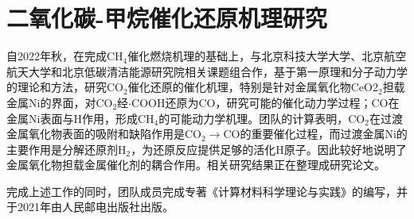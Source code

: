 \section{二氧化碳-甲烷催化还原机理研究}
自2022年秋，在完成$\mathrm{CH}_4$催化燃烧机理的基础上，与北京科技大学大学、北京航空航天大学和北京低碳清洁能源研究院相关课题组合作，基于第一原理和分子动力学的理论和方法，研究$\mathrm{CO}_2$催化还原的催化机理，特别是针对金属氧化物$\mathrm{CeO2}_2$担载金属$\mathrm{Ni}$的界面，对$\mathrm{CO}_2$经$\cdot\mathrm{COOH}$还原为$\mathrm{CO}$，研究可能的催化动力学过程；$\mathrm{CO}$在金属$\mathrm{Ni}$表面与$\mathrm{H}$作用，形成$\mathrm{CH}_4$的可能动力学机理。团队的计算表明，$\mathrm{CO}_2$在过渡金属氧化物表面的吸附和缺陷作用是$\mathrm{CO}_2\rightarrow\mathrm{CO}$的重要催化过程，而过渡金属$\mathrm{Ni}$的主要作用是分解还原剂$\mathrm{H}_2$，为还原反应提供足够的活化$\mathrm{H}$原子。因此较好地说明了金属氧化物担载金属催化剂的耦合作用。相关研究结果正在整理成研究论文。

完成上述工作的同时，团队成员完成专著《计算材料科学理论与实践》的编写，并于2021年由人民邮电出版社出版。
